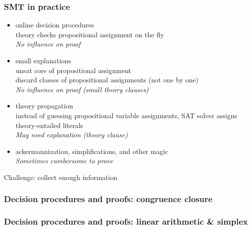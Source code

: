 \documentclass[svgnames,table,mathserif]{beamer}
\begin{document}
\begin{frame}
  \frametitle{SMT in practice}

  \begin{itemize}
  \item online decision procedures\\
    {\small theory checks propositional assignment on the fly}\\
    {\it No influence on proof}
  \item small explanations\\
    {\small unsat core of propositional assignment\\
    discard classes of propositional assignments (not one by one)}\\
    {\it No influence on proof \small (small theory clauses)}
  \item theory propagation\\
    {\small instead of guessing propositional variable
    assignments, SAT solver assigns theory-entailed literals}\\
    {\it May need explanation (theory clause)}
  \item ackermannization, simplifications, and other magic\\
    {\it Sometimes cumbersome to prove}
  \end{itemize}

  \begin{block}{}
    Challenge: collect enough information
  \end{block}

\end{frame}


\begin{frame}
  \frametitle{Decision procedures and proofs: congruence closure}

\end{frame}


\begin{frame}
  \frametitle{Decision procedures and proofs: linear arithmetic \& simplex}

\end{frame}
\end{document}
